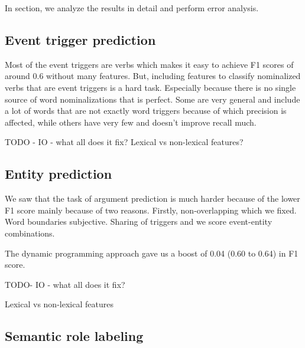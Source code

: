 In section, we analyze the results in detail and perform error analysis.

\subsection{Event trigger prediction}
Most of the event triggers are verbs which makes it easy to achieve F1 scores of around 0.6 without many features. But, including features to classify nominalized verbs that are event triggers is a hard task. Especially because there is no single source of word nominalizations that is perfect. Some are very general and include a lot of words that are not exactly word triggers because of which precision is affected, while others have very few and doesn't improve recall much.


TODO - IO - what all does it fix? Lexical vs non-lexical features?

\subsection{Entity prediction}

We saw that the task of argument prediction is much harder because of the lower F1 score mainly because of two reasons. Firstly, non-overlapping which we fixed. Word boundaries subjective. Sharing of triggers and we score event-entity combinations.

The dynamic programming approach gave us a boost of 0.04 (0.60 to 0.64) in F1 score. 

TODO- IO - what all does it fix?

Lexical vs non-lexical features

\subsection{Semantic role labeling}